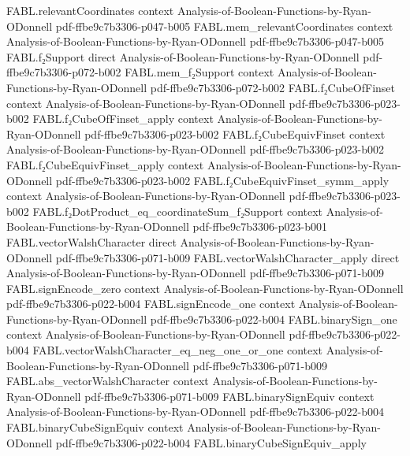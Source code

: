 \begin{theorem}
\proofstep
  {FABL.relevantCoordinates}
  {context}
  {Analysis-of-Boolean-Functions-by-Ryan-ODonnell}
  {pdf-ffbe9c7b3306-p047-b005}
\proofstep
  {FABL.mem_relevantCoordinates}
  {context}
  {Analysis-of-Boolean-Functions-by-Ryan-ODonnell}
  {pdf-ffbe9c7b3306-p047-b005}
\proofstep
  {FABL.f₂Support}
  {direct}
  {Analysis-of-Boolean-Functions-by-Ryan-ODonnell}
  {pdf-ffbe9c7b3306-p072-b002}
\proofstep
  {FABL.mem_f₂Support}
  {context}
  {Analysis-of-Boolean-Functions-by-Ryan-ODonnell}
  {pdf-ffbe9c7b3306-p072-b002}
\proofstep
  {FABL.f₂CubeOfFinset}
  {context}
  {Analysis-of-Boolean-Functions-by-Ryan-ODonnell}
  {pdf-ffbe9c7b3306-p023-b002}
\proofstep
  {FABL.f₂CubeOfFinset_apply}
  {context}
  {Analysis-of-Boolean-Functions-by-Ryan-ODonnell}
  {pdf-ffbe9c7b3306-p023-b002}
\proofstep
  {FABL.f₂CubeEquivFinset}
  {context}
  {Analysis-of-Boolean-Functions-by-Ryan-ODonnell}
  {pdf-ffbe9c7b3306-p023-b002}
\proofstep
  {FABL.f₂CubeEquivFinset_apply}
  {context}
  {Analysis-of-Boolean-Functions-by-Ryan-ODonnell}
  {pdf-ffbe9c7b3306-p023-b002}
\proofstep
  {FABL.f₂CubeEquivFinset_symm_apply}
  {context}
  {Analysis-of-Boolean-Functions-by-Ryan-ODonnell}
  {pdf-ffbe9c7b3306-p023-b002}
\proofstep
  {FABL.f₂DotProduct_eq_coordinateSum_f₂Support}
  {context}
  {Analysis-of-Boolean-Functions-by-Ryan-ODonnell}
  {pdf-ffbe9c7b3306-p023-b001}
\proofstep
  {FABL.vectorWalshCharacter}
  {direct}
  {Analysis-of-Boolean-Functions-by-Ryan-ODonnell}
  {pdf-ffbe9c7b3306-p071-b009}
\proofstep
  {FABL.vectorWalshCharacter_apply}
  {direct}
  {Analysis-of-Boolean-Functions-by-Ryan-ODonnell}
  {pdf-ffbe9c7b3306-p071-b009}
\proofstep
  {FABL.signEncode_zero}
  {context}
  {Analysis-of-Boolean-Functions-by-Ryan-ODonnell}
  {pdf-ffbe9c7b3306-p022-b004}
\proofstep
  {FABL.signEncode_one}
  {context}
  {Analysis-of-Boolean-Functions-by-Ryan-ODonnell}
  {pdf-ffbe9c7b3306-p022-b004}
\proofstep
  {FABL.binarySign_one}
  {context}
  {Analysis-of-Boolean-Functions-by-Ryan-ODonnell}
  {pdf-ffbe9c7b3306-p022-b004}
\proofstep
  {FABL.vectorWalshCharacter_eq_neg_one_or_one}
  {context}
  {Analysis-of-Boolean-Functions-by-Ryan-ODonnell}
  {pdf-ffbe9c7b3306-p071-b009}
\proofstep
  {FABL.abs_vectorWalshCharacter}
  {context}
  {Analysis-of-Boolean-Functions-by-Ryan-ODonnell}
  {pdf-ffbe9c7b3306-p071-b009}
\proofstep
  {FABL.binarySignEquiv}
  {context}
  {Analysis-of-Boolean-Functions-by-Ryan-ODonnell}
  {pdf-ffbe9c7b3306-p022-b004}
\proofstep
  {FABL.binaryCubeSignEquiv}
  {context}
  {Analysis-of-Boolean-Functions-by-Ryan-ODonnell}
  {pdf-ffbe9c7b3306-p022-b004}
\proofstep
  {FABL.binaryCubeSignEquiv_apply}

\end{theorem}
